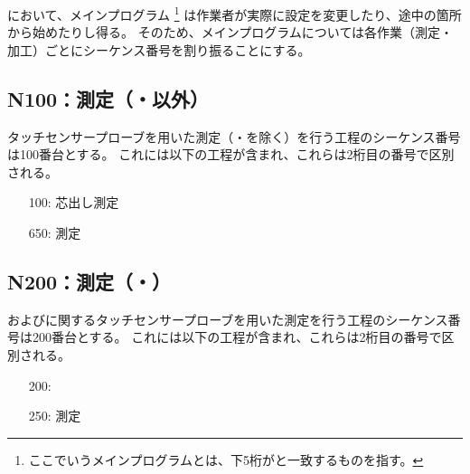\clearpage
\DMC において、メインプログラム
\footnote{ここでいうメインプログラムとは、下5桁が\DrawingNumber と一致するものを指す。}
は作業者が実際に設定を変更したり、途中の箇所から始めたりし得る。
そのため、メインプログラムについては各作業（測定・加工）ごとにシーケンス番号を割り振ることにする。


\subsection{N100：測定（\Dimple・\ReliefGroove 以外）}
タッチセンサープローブを用いた測定（\Dimple ・\ReliefGroove を除く）を行う工程のシーケンス番号は100番台とする。
これには以下の工程が含まれ、これらは2桁目の番号で区別される。
\begin{enumerate}
\item[100:] 芯出し測定
\item[650:] \nameCenterlineEndFaceDif 測定
\end{enumerate}


\subsection{N200：測定（\Dimple・\ReliefGroove）}
\Dimple および\ReliefGroove に関するタッチセンサープローブを用いた測定を行う工程のシーケンス番号は200番台とする。
これには以下の工程が含まれ、これらは2桁目の番号で区別される。
\begin{enumerate}
\item[200:] \DimpleMeasurement
\item[250:] \ReliefGroove 測定
\end{enumerate}


